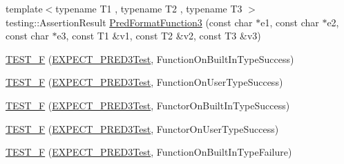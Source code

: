 \begin{DoxyCompactItemize}
\item 
{\footnotesize template$<$typename T1 , typename T2 , typename T3 $>$ }\\testing\+::\+Assertion\+Result \mbox{\hyperlink{_obj__test_2lib_2googletest-release-1_88_81_2googletest_2test_2gtest__pred__impl__unittest_8cc_abddc62e1faf4d19992a0acb69577e0f3}{Pred\+Format\+Function3}} (const char $\ast$e1, const char $\ast$e2, const char $\ast$e3, const T1 \&v1, const T2 \&v2, const T3 \&v3)
\item 
\mbox{\hyperlink{_obj__test_2lib_2googletest-release-1_88_81_2googletest_2test_2gtest__pred__impl__unittest_8cc_a6f0143d40175fd8e84aba9b52e16f3fc}{T\+E\+S\+T\+\_\+F}} (\mbox{\hyperlink{googletest-master_2googletest_2test_2gtest__pred__impl__unittest_8cc_a15eb53ab3f302d7bfffe1352f3902eb4}{E\+X\+P\+E\+C\+T\+\_\+\+P\+R\+E\+D3\+Test}}, Function\+On\+Built\+In\+Type\+Success)
\item 
\mbox{\hyperlink{_obj__test_2lib_2googletest-release-1_88_81_2googletest_2test_2gtest__pred__impl__unittest_8cc_a509632492410e91aa0d85ff1cdeaf1cc}{T\+E\+S\+T\+\_\+F}} (\mbox{\hyperlink{googletest-master_2googletest_2test_2gtest__pred__impl__unittest_8cc_a15eb53ab3f302d7bfffe1352f3902eb4}{E\+X\+P\+E\+C\+T\+\_\+\+P\+R\+E\+D3\+Test}}, Function\+On\+User\+Type\+Success)
\item 
\mbox{\hyperlink{_obj__test_2lib_2googletest-release-1_88_81_2googletest_2test_2gtest__pred__impl__unittest_8cc_af0ec20ab73360a222fe9303586d05411}{T\+E\+S\+T\+\_\+F}} (\mbox{\hyperlink{googletest-master_2googletest_2test_2gtest__pred__impl__unittest_8cc_a15eb53ab3f302d7bfffe1352f3902eb4}{E\+X\+P\+E\+C\+T\+\_\+\+P\+R\+E\+D3\+Test}}, Functor\+On\+Built\+In\+Type\+Success)
\item 
\mbox{\hyperlink{_obj__test_2lib_2googletest-release-1_88_81_2googletest_2test_2gtest__pred__impl__unittest_8cc_a199c9d914ca008105f5521d245e7c1d9}{T\+E\+S\+T\+\_\+F}} (\mbox{\hyperlink{googletest-master_2googletest_2test_2gtest__pred__impl__unittest_8cc_a15eb53ab3f302d7bfffe1352f3902eb4}{E\+X\+P\+E\+C\+T\+\_\+\+P\+R\+E\+D3\+Test}}, Functor\+On\+User\+Type\+Success)
\item 
\mbox{\hyperlink{_obj__test_2lib_2googletest-release-1_88_81_2googletest_2test_2gtest__pred__impl__unittest_8cc_a7de002e386b26ebf47a90ca9b10c7323}{T\+E\+S\+T\+\_\+F}} (\mbox{\hyperlink{googletest-master_2googletest_2test_2gtest__pred__impl__unittest_8cc_a15eb53ab3f302d7bfffe1352f3902eb4}{E\+X\+P\+E\+C\+T\+\_\+\+P\+R\+E\+D3\+Test}}, Function\+On\+Built\+In\+Type\+Failure)
\item 

\end{DoxyCompactItemize}
